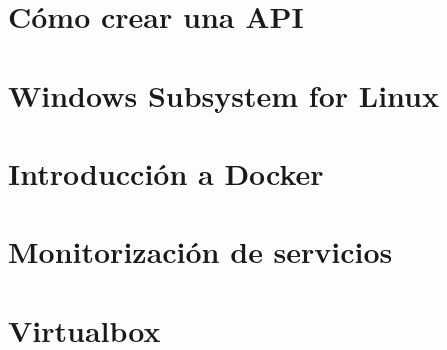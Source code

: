 \documentclass{\ClassPath/yukibook}
\begin{document}
    \part{Cómo crear una API}
    
    
    



    \part{Windows Subsystem for Linux}
    

    \part{Introducción a Docker}
    \graphicspath{{../../../otros/Docker/}}
    

    \part{Monitorización de servicios}
    \graphicspath{{../../../anexos/sistemas_monitorizacion/img/}}
    

    \part{Virtualbox}
    \graphicspath{{../../../anexos/virtualbox_networking/img}}
    
%
%    
\end{document}
